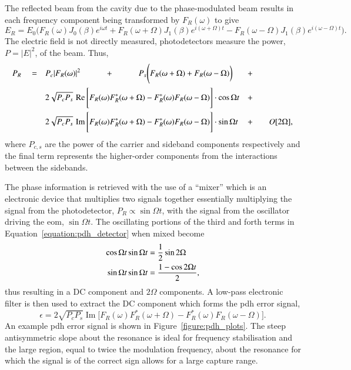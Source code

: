 The reflected beam from the cavity due to the phase-modulated beam results in each frequency component being transformed by $F_R(\omega)$ to give
\begin{equation}
E_R = E_0 \Bigg(F_R(\omega)J_0(\beta)e^{i\omega t} + F_R(\omega+\Omega)J_1(\beta)e^{i(\omega+\Omega) t} - F_R(\omega-\Omega)J_1(\beta)e^{i(\omega-\Omega) t} \Bigg).
\end{equation}
The electric field is not directly measured, photodetectors measure the power, $P=|E|^2$, of the beam.
Thus,
\begin{align}
P_R \quad= \quad&P_c|F_R(\omega)|^2 \quad\qquad+\quad\qquad P_s \Bigg( F_R(\omega+\Omega) + F_R(\omega-\Omega)\bigg) &+\qquad&\notag\\
& 2\sqrt{P_cP_s} \, \operatorname{Re}\Bigg[ F_R(\omega)F_R^*(\omega+\Omega)-F_R^*(\omega)F_R(\omega-\Omega)\Bigg]\cdot\cos\Omega t &+\qquad& \notag\\
& 2\sqrt{P_cP_s} \, \operatorname{Im}\Bigg[ F_R(\omega)F_R^*(\omega+\Omega)-F_R^*(\omega)F_R(\omega-\Omega)\Bigg]\cdot\sin\Omega t &+ \qquad&O[2\Omega],\label{equation:pdh_detector}
\end{align}
where $P_{c,s}$ are the power of the carrier and sideband components respectively and the final term represents the higher-order components from the interactions between the sidebands.

The phase information is retrieved with the use of a ``mixer'' which is an electronic device that multiplies two signals together essentially multiplying the signal from the photodetector, $P_R \propto \sin\Omega t$, with the signal from the oscillator driving the \gls{eom}, $\sin\Omega t$.
The oscillating portions of the third and forth terms in Equation~\ref{equation:pdh_detector} when mixed become
\begin{align}
\cos\Omega t \sin\Omega t &= \frac{1}{2}\sin2\Omega \notag \\
\sin\Omega t \sin\Omega t &= \frac{1-\cos2\Omega t}{2},
\end{align}
thus resulting in a DC component and $2\Omega$ components.
A low-pass electronic filter is then used to extract the DC component which forms the \gls{pdh} error signal,
\begin{equation}\label{equation:pdh_error}
\epsilon = 2\sqrt{P_cP_s}\operatorname{Im}\Bigg[F_R(\omega)F_R^*(\omega+\Omega) - F_R^*(\omega)F_R(\omega-\Omega)\Bigg].
\end{equation}
An example \gls{pdh} error signal is shown in Figure~\ref{figure:pdh_plots}.
The steep antisymmetric slope about the resonance is ideal for frequency stabilisation and the large region, equal to twice the modulation frequency, about the resonance for which the signal is of the correct sign allows for a large capture range. 

